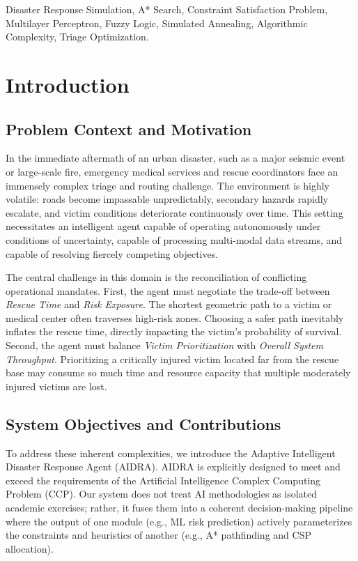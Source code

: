 \documentclass[conference]{IEEEtran}
\begin{document}
\begin{IEEEkeywords}
Disaster Response Simulation, A* Search, Constraint Satisfaction Problem, Multilayer Perceptron, Fuzzy Logic, Simulated Annealing, Algorithmic Complexity, Triage Optimization.
\end{IEEEkeywords}

\section{Introduction}

\subsection{Problem Context and Motivation}
In the immediate aftermath of an urban disaster, such as a major seismic event or large-scale fire, emergency medical services and rescue coordinators face an immensely complex triage and routing challenge. The environment is highly volatile: roads become impassable unpredictably, secondary hazards rapidly escalate, and victim conditions deteriorate continuously over time. This setting necessitates an intelligent agent capable of operating autonomously under conditions of uncertainty, capable of processing multi-modal data streams, and capable of resolving fiercely competing objectives.

The central challenge in this domain is the reconciliation of conflicting operational mandates. First, the agent must negotiate the trade-off between \textit{Rescue Time} and \textit{Risk Exposure}. The shortest geometric path to a victim or medical center often traverses high-risk zones. Choosing a safer path inevitably inflates the rescue time, directly impacting the victim's probability of survival. Second, the agent must balance \textit{Victim Prioritization} with \textit{Overall System Throughput}. Prioritizing a critically injured victim located far from the rescue base may consume so much time and resource capacity that multiple moderately injured victims are lost. 

\subsection{System Objectives and Contributions}
To address these inherent complexities, we introduce the Adaptive Intelligent Disaster Response Agent (AIDRA). AIDRA is explicitly designed to meet and exceed the requirements of the Artificial Intelligence Complex Computing Problem (CCP). Our system does not treat AI methodologies as isolated academic exercises; rather, it fuses them into a coherent decision-making pipeline where the output of one module (e.g., ML risk prediction) actively parameterizes the constraints and heuristics of another (e.g., A* pathfinding and CSP allocation).
\end{document}
